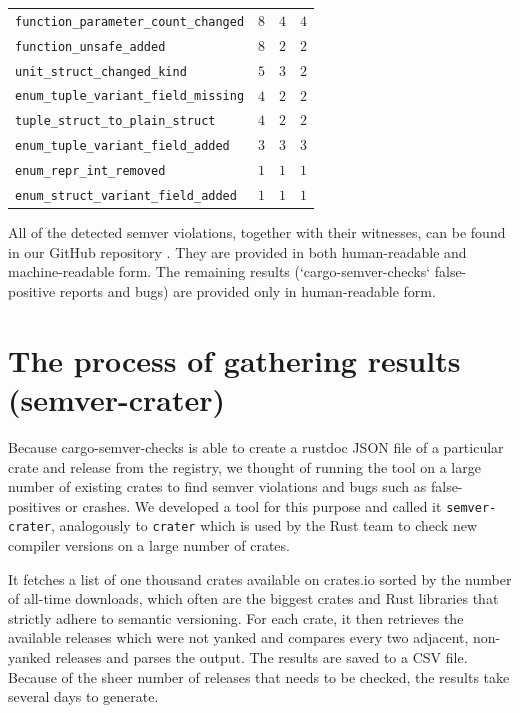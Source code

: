 \documentclass[licencjacka,en]{pracamgr}
\newcommand\Bspace{\rule[-0.9ex]{0pt}{0pt}}   %
\begin{document}
\begin{center}
\begin{longtable}{| p{7.75cm} | p{1.975cm} | p{1.975cm} | p{1.975cm} |}
			\texttt{function\_parameter\_count\_changed} & $8$ & $4$ & $4$ \\
			\texttt{function\_unsafe\_added} & $8$ & $2$ & $2$ \\
			\texttt{unit\_struct\_changed\_kind} & $5$ & $3$ & $2$ \\
			\texttt{enum\_tuple\_variant\_field\_missing} & $4$ & $2$ & $2$ \\
			\texttt{tuple\_struct\_to\_plain\_struct} & $4$ & $2$ & $2$ \\
			\texttt{enum\_tuple\_variant\_field\_added} & $3$ & $3$ & $3$ \\
			\texttt{enum\_repr\_int\_removed} & $1$ & $1$ & $1$ \\
			\texttt{enum\_struct\_variant\_field\_added} & $1$ & $1$ & $1$ \Bspace \\
		\hline
	\end{longtable}
\end{center}

All of the detected semver violations, together with their witnesses, can be found in our GitHub repository \cite{github-csv-results}.
They are provided in both human-readable and machine-readable form.
The remaining results (`cargo-semver-checks` false-positive reports and bugs) are provided only in human-readable form.

\section{The process of gathering results (semver-crater)}\label{r:section_results_semver_crater}

Because cargo-semver-checks is able to create a rustdoc JSON file
of a particular crate and release from the registry,
we thought of running the tool on a large number of existing crates
to find semver violations and bugs such as false-positives or crashes.
We developed a tool for this purpose and called it \texttt{semver-crater},
analogously to \texttt{crater} which is used by the Rust team to check
new compiler versions on a large number of crates.

It fetches a list of one thousand crates available on crates.io sorted by the number of
all-time downloads, which often are the biggest crates and Rust libraries
that strictly adhere to semantic versioning. For each crate,
it then retrieves the available releases which were not yanked
and compares every two adjacent, non-yanked releases and parses the output.
The results are saved to a CSV file.
Because of the sheer number of releases that needs to be checked, the results take several days to generate.
\end{document}
